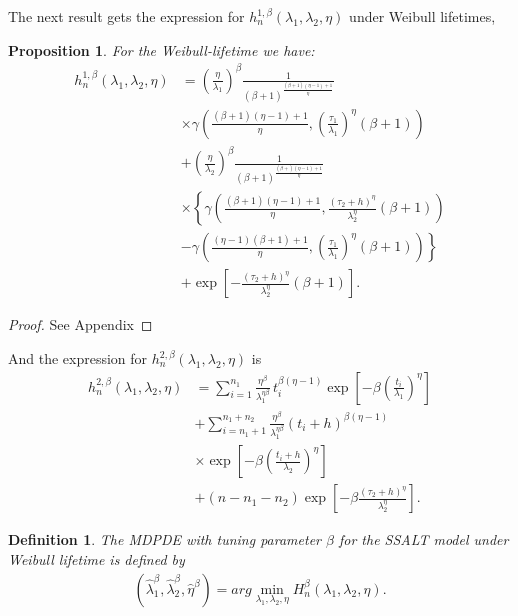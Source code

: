 \documentclass{article}
\newtheorem{definition}[theorem]{Definition}
\newtheorem{proposition}[theorem]{Proposition}
\begin{document}
The next result gets the expression for $h_{n}^{1,\beta}\left(\lambda_1,\lambda_2,\eta\right)$ under Weibull lifetimes,
\begin{proposition}
For the Weibull-lifetime we have:
\begin{align*}
h_{n}^{1,\beta}(\lambda_1,\lambda_2,\eta)&=\left(\frac{\eta}{\lambda_1}\right)^{\beta}\frac{1}{(\beta+1)^{\frac{(\beta+1)(\eta-1)+1}{\eta}}}
\\
&\times \gamma\left(\frac{(\beta+1)(\eta-1)+1}{\eta}, \left(\frac{\tau_1}{\lambda_1}\right)^{\eta}(\beta+1)\right)
\\
&+\left(\frac{\eta}{\lambda_2}\right)^{\beta}\frac{1}{(\beta+1)^{\frac{(\beta+)(\eta-1)+1}{\eta}}}
\\
&\times \left\{\gamma\left(\frac{(\beta+1)(\eta-1)+1}{\eta},\frac{\left(\tau_2+h\right)^{\eta}}{\lambda_2^{\eta}}(\beta+1)\right)\right.
\\
&-\left. \gamma\left(\frac{(\eta-1)(\beta+1)+1}{\eta},\left(\frac{\tau_1}{\lambda_1}\right)^{\eta}(\beta+1)\right) \right\}
\\
&+\exp\left[-\frac{\left(\tau_2+h\right)^{\eta}}{\lambda_2^{\eta}}(\beta+1)\right].
\end{align*}

\label{thm:Hn}
\end{proposition}
\begin{proof}
See Appendix
\end{proof}
And the expression for $h_{n}^{2,\beta}(\lambda_1,\lambda_2,\eta)$  is
\begin{align*}
h_{n}^{2,\beta}\left(\lambda_1,\lambda_2,\eta\right)
&=\sum_{i=1}^{n_1}\frac{\eta^{\beta}}{\lambda_1^{\eta \beta}}\,t_i^{\beta\left(\eta-1\right)}
\exp\left[-\beta\left(\frac{t_i}{\lambda_1}\right)^{\eta}\right] \\
& +\sum_{i=n_1+1}^{n_1+n_2} \frac{\eta^{\beta}}{\lambda_1^{\eta \beta}}\left(t_i+h\right)^{\beta\left(\eta-1\right)}\\
&\times\exp\left[-\beta\left(\frac{t_i+h}{\lambda_2}\right)^{\eta}\right] \\
& +\left(n-n_1-n_2\right)\exp\left[-\beta\frac{\left(\tau_2+h\right)^{\eta}}{\lambda_2^\eta} \right].
\end{align*}
\begin{definition}
The MDPDE with tuning parameter $\beta$ for the SSALT model under Weibull lifetime is defined by
\begin{align*}
\left(\hat{\lambda}_1^{\beta},\hat{\lambda}_2^{\beta},\hat{\eta}^{\beta}\right)=arg \min_{\lambda_1,\lambda_2,\eta}H_{n}^{\beta}\left(\lambda_1,\lambda_2,\eta\right).
\end{align*}
\end{definition}
\end{document}

